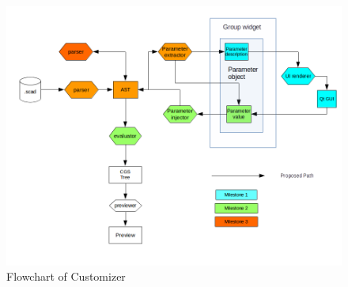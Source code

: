 \begin{figure}[H]
\centering \includegraphics[scale=0.6]{images/flowchart.png}
\caption{Flowchart of Customizer}
\label{fig:FD1}
\end{figure}
